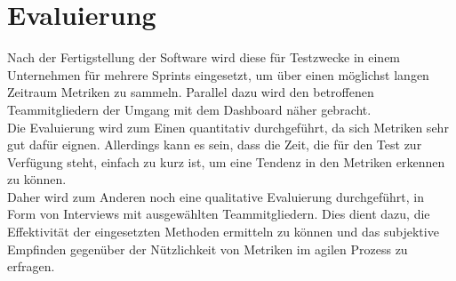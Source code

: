 \clearpage
\section{Evaluierung}

Nach der Fertigstellung der Software wird diese für Testzwecke in einem Unternehmen für mehrere Sprints eingesetzt, um über einen möglichst langen Zeitraum Metriken zu sammeln.
Parallel dazu wird den betroffenen Teammitgliedern der Umgang mit dem Dashboard näher gebracht.
\\
Die Evaluierung wird zum Einen quantitativ durchgeführt, da sich Metriken sehr gut dafür eignen.
Allerdings kann es sein, dass die Zeit, die für den Test zur Verfügung steht, einfach zu kurz ist, um eine Tendenz in den Metriken erkennen zu können.
\\
Daher wird zum Anderen noch eine qualitative Evaluierung durchgeführt, in Form von Interviews mit ausgewählten Teammitgliedern.
Dies dient dazu, die Effektivität der eingesetzten Methoden ermitteln zu können und das subjektive Empfinden gegenüber der Nützlichkeit von Metriken im agilen Prozess zu erfragen.
